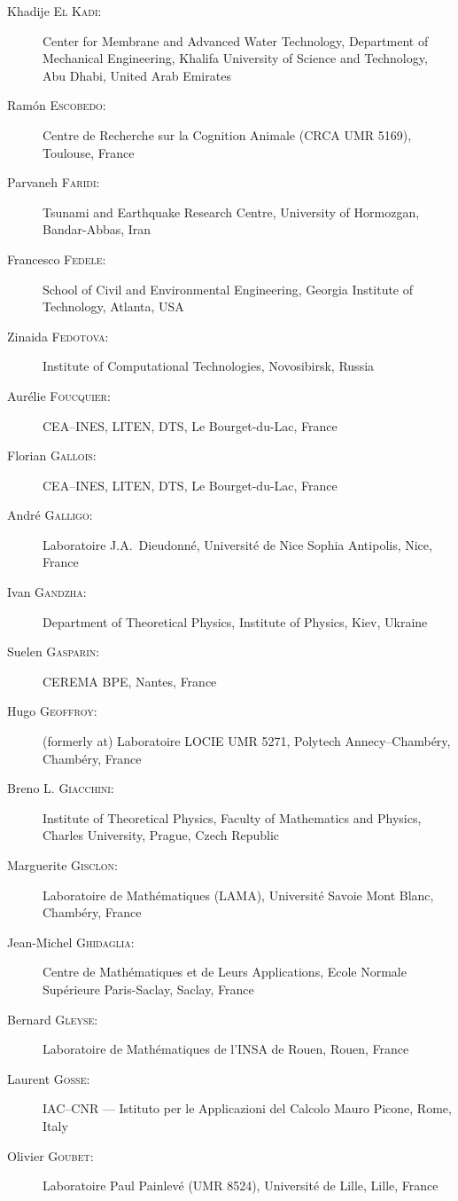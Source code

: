 \begin{description}
  \item[Khadije \textsc{El Kadi}:] Center for Membrane and Advanced Water Technology, Department of Mechanical Engineering, Khalifa University of Science and Technology, Abu Dhabi, United Arab Emirates
  \item[Ram\'on \textsc{Escobedo}:] Centre de Recherche sur la Cognition Animale (CRCA UMR 5169), Toulouse, France
  \item[Parvaneh \textsc{Faridi}:] Tsunami and Earthquake Research Centre, University of Hormozgan, Bandar-Abbas, Iran
  \item[Francesco \textsc{Fedele}:] School of Civil and Environmental Engineering, Georgia Institute of Technology, Atlanta, USA
  \item[Zinaida \textsc{Fedotova}:] Institute of Computational Technologies, Novosibirsk, Russia
  \item[Aur\'elie \textsc{Foucquier}:] CEA--INES, LITEN, DTS, Le Bourget-du-Lac, France
  \item[Florian \textsc{Gallois}:] CEA--INES, LITEN, DTS, Le Bourget-du-Lac, France
  \item[Andr\'e \textsc{Galligo}:] Laboratoire J.A.~Dieudonn\'e, Universit\'e de Nice Sophia Antipolis, Nice, France
  \item[Ivan \textsc{Gandzha}:] Department of Theoretical Physics, Institute of Physics, Kiev, Ukraine
  \item[Suelen \textsc{Gasparin}:] CEREMA BPE, Nantes, France
  \item[Hugo \textsc{Geoffroy}:] (formerly at) Laboratoire LOCIE UMR 5271, Polytech Annecy--Chamb\'ery, Chamb\'ery, France
  \item[Breno L. \textsc{Giacchini}:] Institute of Theoretical Physics, Faculty of Mathematics and Physics, Charles University, Prague, Czech Republic
  \item[Marguerite \textsc{Gisclon}:] Laboratoire de Math\'ematiques (LAMA), Universit\'e Savoie Mont Blanc, Chamb\'ery, France
  \item[Jean-Michel \textsc{Ghidaglia}:] Centre de Math\'ematiques et de Leurs Applications, Ecole Normale Sup\'erieure Paris-Saclay, Saclay, France
  \item[Bernard \textsc{Gleyse}:] Laboratoire de Math\'ematiques de l'INSA de Rouen, Rouen, France
  \item[Laurent \textsc{Gosse}:] IAC--CNR --- Istituto per le Applicazioni del Calcolo Mauro Picone, Rome, Italy
  \item[Olivier \textsc{Goubet}:] Laboratoire Paul Painlev\'e (UMR 8524), Universit\'e de Lille, Lille, France

\end{description}
